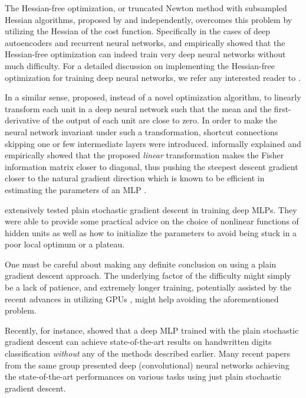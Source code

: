 \documentclass{now}
\begin{document}
The Hessian-free optimization, or truncated Newton method with
subsampled Hessian algorithms, proposed by
\citet{Martens2010} and \citet{Byrd2011} independently,
overcomes this problem by utilizing the Hessian of the cost
function. Specifically in the cases of deep autoencoders and
recurrent neural networks, \citet{Martens2010} and
\citet{Sutskever2011} empirically showed that the
Hessian-free optimization can indeed train very deep neural
networks without much difficulty. For a detailed discussion
on implementing the Hessian-free optimization for training
deep neural networks, we refer any interested reader to
\citep{Martens2012}.

In a similar sense, \citet{Raiko2012} proposed, instead of a
novel optimization algorithm, to linearly transform each
unit in a deep neural network such that the mean and the
first-derivative of the output of each unit are close to
zero. In order to make the neural network invariant under
such a transformation, shortcut connections skipping one or
few intermediate layers were introduced. \citet{Raiko2012}
informally explained and empirically showed that the
proposed \textit{linear} transformation makes the Fisher
information matrix closer to diagonal, thus pushing the
steepest descent gradient closer to the natural gradient
direction which is known to be efficient in estimating the
parameters of an MLP \citep{Amari1998}.

\citet{Glorot2010} extensively tested plain stochastic
gradient descent in training deep MLPs. They were able to
provide some practical advice on the choice of nonlinear
functions of hidden units as well as how to initialize the
parameters to avoid being stuck in a poor
local optimum or a plateau.

One must be careful about making any definite conclusion on using
a plain gradient descent approach. The underlying factor of the
difficulty might simply be a lack of patience, and extremely
longer training, potentially assisted by the recent advances in
utilizing GPUs \citep{Raina2009}, might help avoiding the
aforementioned problem.

Recently, for instance, \citet{Ciresan2012g} showed that a
deep MLP trained with the plain stochastic gradient descent
can achieve state-of-the-art results on handwritten
digits classification \textit{without} any of the methods
described earlier. Many recent papers from the same group
\citep[see, e.g.][]{Ciresan2012c,Ciresan2012b,Ciresan2012f}
presented deep (convolutional) neural networks  achieving
the state-of-the-art performances on various tasks
using just plain stochastic gradient descent.
\end{document}
